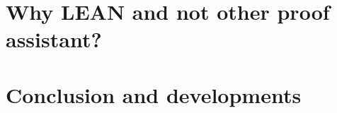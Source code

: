 \documentclass[runningheads]{llncs}
\newcommand{\LEAN}{\textsf{LEAN}\xspace}
\begin{document}
\section{Why \LEAN and not other proof assistant?}
\label{section:Why LEAN and not other proof assistant?}

\section{Conclusion and developments}
\label{section:Conclusion and developments}




\end{document}
